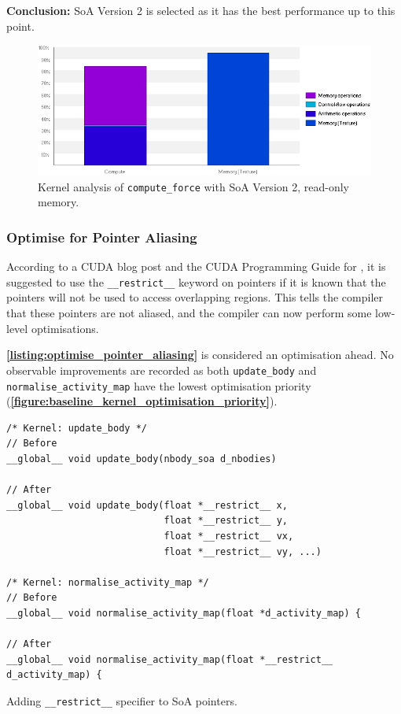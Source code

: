 \documentclass[12pt, a4paper]{article}
\let\oldcref\cref
\renewcommand{\cref}[1]{\textbf{\oldcref{#1}}}
\begin{document}
\noindent \textbf{Conclusion:} SoA Version 2 is selected as it has the best performance up to this
point.

\begin{figure}[ht]
  \centering
  \includegraphics[width=.82\textwidth]{images/soa_v2_read_only_mem.png}
  \caption{Kernel analysis of \texttt{compute\_force} with SoA Version 2, read-only memory.}
  \label{figure:soa_v2_read_only_mem}
\end{figure}

\subsubsection{Optimise for Pointer Aliasing} \label{subsubsec:optimise_pointer_aliasing}
According to a CUDA blog post \cite{cuda_blog_pointer_aliasing} and the CUDA Programming Guide for
\cite{restrict}, it is suggested to use the \texttt{__restrict__} keyword on pointers if
it is known that the pointers will not be used to access overlapping regions. This tells the
compiler that these pointers are not aliased, and the compiler can now perform some low-level
optimisations.

\cref{listing:optimise_pointer_aliasing} is considered an optimisation ahead. No observable
improvements are recorded as both \texttt{update\_body} and \texttt{normalise\_activity\_map} have
the lowest optimisation priority (\cref{figure:baseline_kernel_optimisation_priority}).

\begin{listing}[H]
  \begin{verbatim}
/* Kernel: update_body */
// Before
__global__ void update_body(nbody_soa d_nbodies)

// After
__global__ void update_body(float *__restrict__ x,
                            float *__restrict__ y,
                            float *__restrict__ vx,
                            float *__restrict__ vy, ...)

/* Kernel: normalise_activity_map */
// Before
__global__ void normalise_activity_map(float *d_activity_map) {

// After
__global__ void normalise_activity_map(float *__restrict__ d_activity_map) {
  \end{verbatim}
  \caption{Adding \texttt{__restrict__} specifier to SoA pointers.}
  \label{listing:optimise_pointer_aliasing}
\end{listing}
\end{document}
